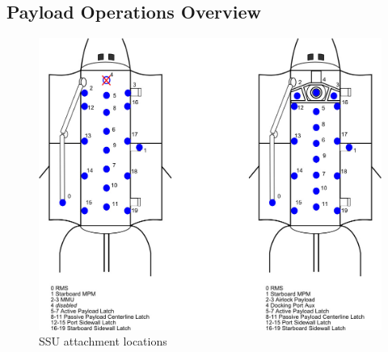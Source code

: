 \documentclass[13pt]{article}
\begin{document}
\subsection{Payload Operations Overview}
\begin{figure}[b!]
  \centering
  \includegraphics[width=1\textwidth]{SSU_Attachments.png}
  \caption{SSU attachment locations}
  \label{fig:SSUAttachments}
\end{figure}
\end{document}

